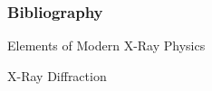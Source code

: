 \documentclass[aspectratio=169]{beamer}
\begin{document}
\begin{frame}[allowframebreaks]
	\frametitle<presentation>{Bibliography}
	
	\begin{thebibliography}{10}
	
	\beamertemplatebookbibitems
	
	\bibitem{*}
		\newblock Elements of Modern X-Ray Physics
		
	\bibitem{*}
		\newblock X-Ray Diffraction
	
	\end{thebibliography}
\end{frame}
\end{document}
